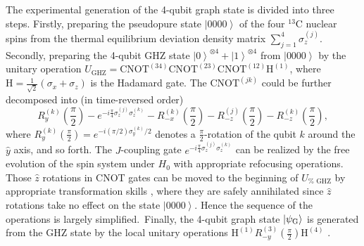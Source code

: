 \documentclass[showpacs,superscriptaddress,twocolumn,prl]{revtex4}
\begin{document}

The experimental generation of the 4-qubit graph state is divided into three
steps. Firstly, preparing the pseudopure state $\left\vert 0000\right\rangle
$ of the four $^{13}$C nuclear spins from the thermal equilibrium deviation
density matrix $\sum\nolimits_{j=1}^{4}\sigma _{z}^{(j)}$. Secondly,
preparing the 4-qubit GHZ state $\left\vert 0\right\rangle ^{\otimes
4}+\left\vert 1\right\rangle ^{\otimes 4}$ from $\left\vert
0000\right\rangle $ by the unitary operation $U_{\text{GHZ}}=\text{CNOT}%
^{(34)}\text{CNOT}^{(23)}\text{CNOT}^{(12)}\text{H}^{(1)}$, where $\text{H}=%
\frac{1}{\sqrt{2}}(\sigma _{x}+\sigma _{z})$ is the Hadamard gate. The $%
\text{CNOT}^{(jk)}$ could be further decomposed into (in time-reversed order)%
\begin{equation}
R_{y}^{(k)}(\frac{\pi }{2})-e^{-i\frac{\pi }{4}\sigma _{z}^{(j)}\sigma
_{z}^{(k)}}-R_{-x}^{(k)}(\frac{\pi }{2})-R_{-z}^{(j)}(\frac{\pi }{2}%
)-R_{-z}^{(k)}(\frac{\pi }{2}),
\end{equation}%
where $R_{y}^{(k)}(\frac{\pi }{2})=e^{-i(\pi /2)\sigma _{y}^{(k)}/2}$
denotes a $\frac{\pi }{2}$-rotation of the qubit $k$ around the $\hat{y}$
axis, and so forth. The $J$-coupling gate $e^{-i\frac{\pi }{4}\sigma
_{z}^{(j)}\sigma _{z}^{(k)}}$ can be realized by the free evolution of the
spin system under $H_{0}$ with appropriate refocusing operations. Those $%
\hat{z}$ rotations in CNOT gates can be moved to the beginning of $U_{\text{%
GHZ}}$ by appropriate transformation skills \cite{nmrreview}, where they are
safely annihilated since $\hat{z}$ rotations take no effect on the state $%
\left\vert 0000\right\rangle $. Hence the sequence of the operations is
largely simplified.\ Finally, the 4-qubit graph state $\left\vert \psi _{%
\text{G}}\right\rangle $ is generated from the GHZ state by the local
unitary operations $\text{H}^{(1)}R_{-y}^{(3)}(\frac{\pi }{2})\text{H}^{(4)}$%
.
\end{document}

